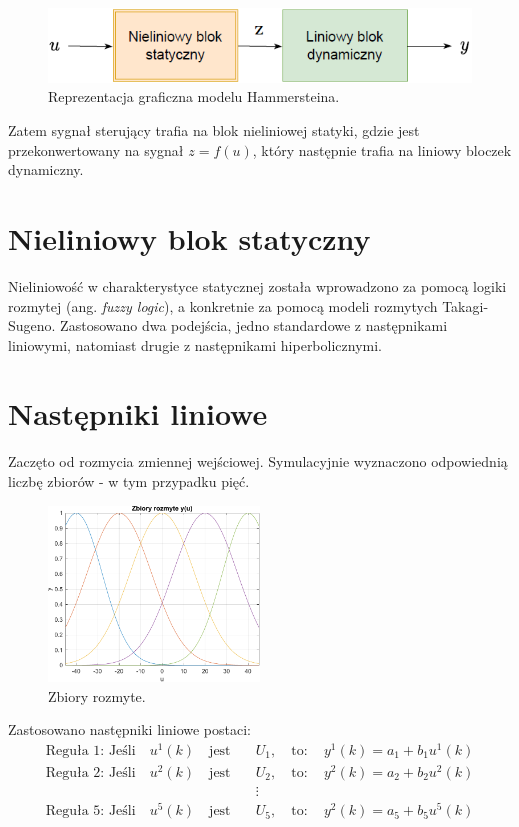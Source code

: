 \documentclass[a4paper,titlepage,11pt,floatssmall]{mwrep}
\begin{document}
\begin{figure}[h!]
\centering
\includegraphics[width=\textwidth]{pictures/hamm_model}
\caption{Reprezentacja graficzna modelu Hammersteina.}
\label{hamm_model}
\end{figure}

\noindent Zatem sygnał sterujący trafia na blok nieliniowej statyki, gdzie jest przekonwertowany na sygnał $z = f(u)$, który następnie trafia na liniowy bloczek dynamiczny. 

\section{Nieliniowy blok statyczny}
Nieliniowość w charakterystyce statycznej została wprowadzono za pomocą logiki rozmytej (ang. \textit{fuzzy logic}), a konkretnie za pomocą modeli rozmytych Takagi-Sugeno. Zastosowano dwa podejścia, jedno standardowe z następnikami liniowymi, natomiast drugie z następnikami hiperbolicznymi.

\section{Następniki liniowe}
Zaczęto od rozmycia zmiennej wejściowej. Symulacyjnie wyznaczono odpowiednią liczbę zbiorów - w tym przypadku pięć.

\begin{figure}[h!]
\centering
\includegraphics[width=0.5\textwidth]{pictures/fuzzy_set_ham}
\caption{Zbiory rozmyte.}
\label{hamm_model}
\end{figure}

\noindent Zastosowano następniki liniowe postaci:
\begin{equation}
\begin{aligned}
\text{Reguła 1: Jeśli} \quad u^1(k) \quad \text{jest} \quad &U_1, \quad \text{to}: \quad y^1(k) = a_1 + b_1 u^1(k) \\
\text{Reguła 2: Jeśli} \quad u^2(k) \quad \text{jest} \quad &U_2, \quad \text{to}: \quad y^2(k) = a_2 + b_2 u^2(k) \\ 
&\vdots \\
\text{Reguła 5: Jeśli} \quad u^5(k) \quad \text{jest} \quad &U_5, \quad \text{to}: \quad y^2(k) = a_5 + b_5 u^5(k) \\
\end{aligned}
\label{nastepniki_lin}
\end{equation}
\end{document}
